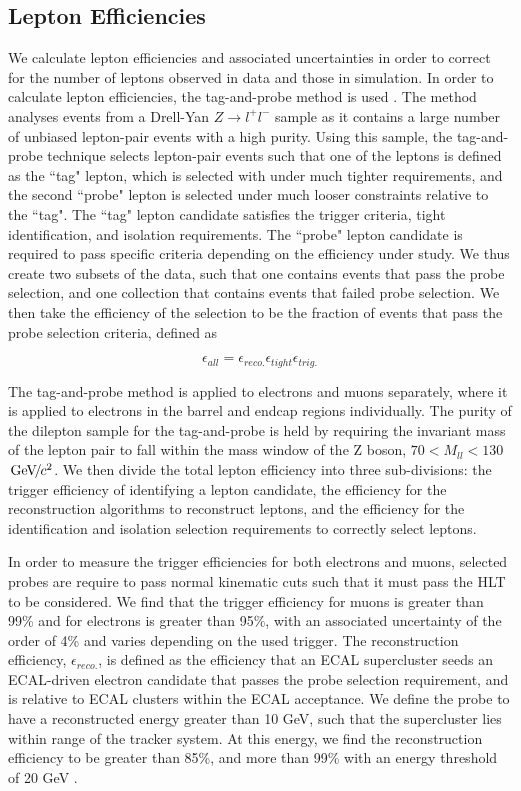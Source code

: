 \subsection{Lepton Efficiencies} \label{subsec-LeptonEfficiencies}

We calculate lepton efficiencies and associated uncertainties in order to correct for the number of leptons observed in data and those in simulation. In order to calculate lepton efficiencies, the tag-and-probe method is used \cite{tagandprobe}. The method analyses events from a Drell-Yan $Z \to l^+l^-$ sample as it contains a large number of unbiased lepton-pair events with a high purity. Using this sample, the tag-and-probe technique selects lepton-pair events such that one of the leptons is defined as the ``tag" lepton, which is selected with under much tighter requirements, and the second ``probe" lepton is selected under much looser constraints relative to the ``tag".  The ``tag" lepton candidate satisfies the trigger criteria, tight identification, and isolation requirements. The ``probe" lepton candidate is required to pass specific criteria depending on the efficiency under study. We thus create two subsets of the data, such that one contains events that pass the probe selection, and one collection that contains events that failed probe selection. We then take the efficiency of the selection to be the fraction of events that pass the probe selection criteria, defined as 

\begin{equation}
\epsilon_{all} = \epsilon_{reco.}\epsilon_{tight}\epsilon_{trig.}
\end{equation}

The tag-and-probe method is applied to electrons and muons separately, where it is applied to electrons in the barrel and endcap regions individually. The purity of the dilepton sample for the tag-and-probe is held by requiring the invariant mass of the lepton pair to fall within the mass window of the Z boson, $70 < M_{ll} < 130$ ${\,\text{Ge\hspace{-.08em}V\hspace{-0.16em}/\hspace{-0.08em}}c^\text{2}}$. We then divide the total lepton efficiency into three sub-divisions: the trigger efficiency of identifying a lepton candidate, the efficiency for the reconstruction algorithms to reconstruct leptons, and the efficiency for the identification and isolation selection requirements to correctly select leptons. 

In order to measure the trigger efficiencies for both electrons and muons, selected probes are require to pass normal kinematic cuts such that it must pass the HLT to be considered. We find that the trigger efficiency for muons is greater than 99\% and for electrons is greater than 95\%, with an associated uncertainty of the order of 4\% and varies depending on the used trigger. The reconstruction efficiency, $\epsilon_{reco.}$, is defined as the efficiency that an ECAL supercluster seeds an ECAL-driven electron candidate that passes the probe selection requirement, and is relative to ECAL clusters within the ECAL acceptance. We define the probe to have a reconstructed energy greater than 10 GeV, such that the supercluster lies within range of the tracker system. At this energy, we find the reconstruction efficiency to be greater than 85\%, and more than 99\% with an energy threshold of 20 GeV \cite{Khachatryan:2015hwa}.

